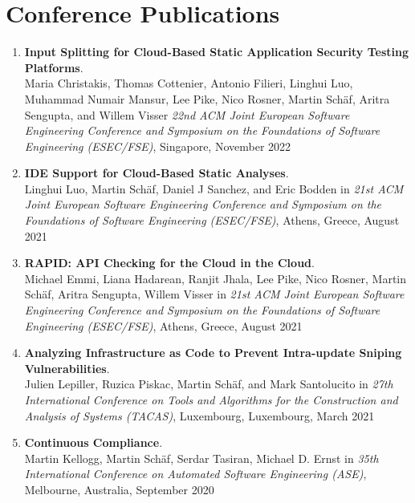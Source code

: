 \section{\sc Conference Publications}


\begin{enumerate}

\item \textbf{Input Splitting for Cloud-Based Static Application Security Testing Platforms}.
\\ Maria Christakis, Thomas Cottenier, Antonio Filieri, Linghui Luo, Muhammad Numair Mansur, Lee Pike, Nico Rosner, Martin Sch\"af, Aritra Sengupta, and Willem Visser
\emph{22nd ACM Joint European Software Engineering Conference and Symposium on the Foundations of Software Engineering (ESEC/FSE)},
Singapore, November 2022

\item \textbf{IDE Support for Cloud-Based Static Analyses}.
\\ Linghui Luo, Martin Sch\"af, Daniel J Sanchez, and Eric Bodden in 
\emph{21st ACM Joint European Software Engineering Conference and Symposium on the Foundations of Software Engineering (ESEC/FSE)},
Athens, Greece, August 2021

\item \textbf{RAPID: API Checking for the Cloud in the Cloud}.
\\ Michael Emmi, Liana Hadarean, Ranjit Jhala, Lee Pike, Nico Rosner, Martin Sch\"af, Aritra Sengupta, Willem Visser in 
\emph{21st ACM Joint European Software Engineering Conference and Symposium on the Foundations of Software Engineering (ESEC/FSE)},
Athens, Greece, August 2021

\item \textbf{Analyzing Infrastructure as Code to Prevent Intra-update Sniping Vulnerabilities}.
\\ Julien Lepiller, Ruzica Piskac, Martin Sch\"af, and Mark Santolucito in 
\emph{27th International Conference on Tools and Algorithms for the Construction and Analysis of Systems (TACAS)},
Luxembourg, Luxembourg, March 2021

\item \textbf{Continuous Compliance}.
\\ Martin Kellogg, Martin Sch\"af, Serdar Tasiran, Michael D. Ernst in 
\emph{35th International Conference on Automated Software Engineering (ASE)},
Melbourne, Australia, September 2020


\end{enumerate}
